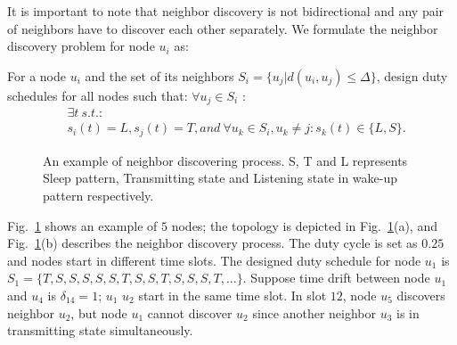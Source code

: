 It is important to note that neighbor discovery is not bidirectional and
any pair of neighbors have to discover each other separately.
We formulate the neighbor discovery problem for node $u_i$ as:
\begin{problem}
For a node $u_i$ and the set of its neighbors $S_i = \{u_j | d(u_i, u_j)\leq \Delta \}$, design duty schedules for all nodes such that:
$\forall u_j \in S_i$ :
$$
\begin{aligned}
&\exists t \ s.t. :   \\%
&s_i(t) = L ,
s_{j}(t) = T, and~
\forall u_k \in S_i, u_k \neq j : s_{k}(t) \in \{L, S\}.
\end{aligned}
$$
\end{problem}


\begin{figure}[!h]
\centering
{}
\vspace{0.03in}
\caption{An example of neighbor discovering process. S, T and L represents Sleep pattern,
Transmitting state and Listening state in wake-up pattern respectively.}
\label{NDexample}
\end{figure}

Fig.~\ref{NDexample} shows an example of $5$ nodes; the topology is
depicted in Fig.~\ref{NDexample}(a), and Fig.~\ref{NDexample}(b) describes
the neighbor discovery process. The duty cycle is set as $0.25$ and
nodes start in different time slots.
The designed duty schedule for node $u_1$ is $S_1 = \{ T, S, S, S, S, S, T, S, S, T, S, S, S, T, ... \}$.
Suppose time drift between node $u_1$ and $u_4$ is $\delta_{14} = 1$; $u_1$ $u_2$ start in the same time slot. 
In slot $12$, node $u_5$ discovers neighbor $u_2$, but node $u_1$ cannot discover $u_2$ since another neighbor $u_3$ is in transmitting state simultaneously.

